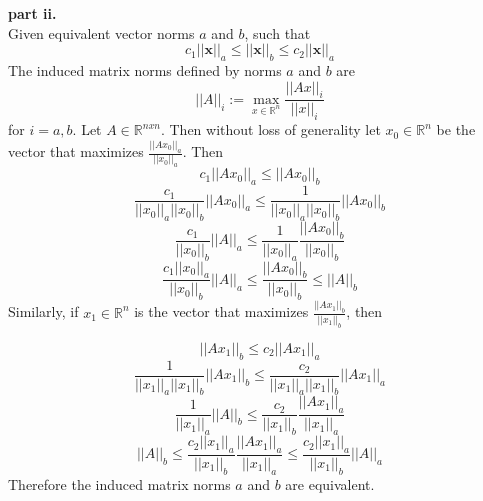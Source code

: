 \documentclass{article} %
\begin{document}
\textbf{part ii.} \\
Given equivalent vector norms $a$ and $b$, such that 
\begin{equation}
c_1||\boldsymbol{x}||_a \leq ||\boldsymbol{x}||_b \leq c_2 ||\boldsymbol{x}||_a
\end{equation}
The induced matrix norms defined by norms $a$ and $b$ are 
\begin{equation}
||A||_i := \max_{x \in \mathbb{R}^n} \frac{||Ax||_i}{||x||_i}
\end{equation}
for $i=a, b$.  Let $A \in \mathbb{R}^{nxn}$.  Then without loss of generality let $x_0 \in \mathbb{R}^n$ be the vector that maximizes $\frac{||Ax_0||_a}{||x_0||_a}$.  Then 
\begin{equation}
c_1||A x_0||_a \leq ||A x_0||_b
\end{equation}
\begin{equation}
\frac{c_1}{||x_0||_a||x_0||_b}||A x_0||_a \leq \frac{1}{||x_0||_a||x_0||_b} ||A x_0||_b 
\end{equation}
\begin{equation}
\frac{c_1}{||x_0||_b}||A||_a \leq \frac{1}{||x_0||_a}\frac{||A x_0||_b}{||x_0||_b}  
\end{equation}
\begin{equation}
\frac{c_1||x_0||_a}{||x_0||_b}||A||_a \leq \frac{||A x_0||_b}{||x_0||_b}  \leq ||A||_b
\end{equation}
Similarly, if $x_1 \in \mathbb{R}^n$ is the vector that maximizes $\frac{||Ax_1||_b}{||x_1||_b}$, then

\begin{equation}
||A x_1||_b \leq c_2 ||A x_1||_a
\end{equation}
\begin{equation}
\frac{1}{||x_1||_a||x_1||_b}||A x_1||_b \leq \frac{c_2}{||x_1||_a||x_1||_b} ||A x_1||_a
\end{equation}
\begin{equation}
\frac{1}{||x_1||_a}||A||_b \leq \frac{c_2}{||x_1||_b}\frac{||A x_1||_a}{||x_1||_a}  
\end{equation}
\begin{equation}
||A||_b \leq \frac{c_2 ||x_1||_a}{||x_1||_b}\frac{||A x_1||_a}{||x_1||_a}  \leq \frac{c_2 ||x_1||_a}{||x_1||_b} ||A||_a
\end{equation}
Therefore the induced matrix norms $a$ and $b$ are equivalent. \\
\end{document}
